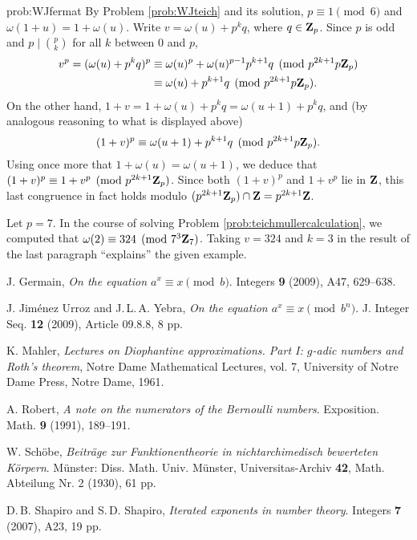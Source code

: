 \begin{sol}{prob:WJfermat}   By Problem \ref{prob:WJteich} and its solution, $p\equiv 1\pmod{6}$ and $\omega(1+u) = 1 + \omega(u)$. Write $v=\omega(u) + p^k q$, where $q \in \mathbf{Z}_p$. Since $p$ is odd and $p \mid \binom{p}{k}$ for all $k$ between $0$ and $p$,
\begin{align*}
  v^p = (\omega(u)+p^k q)^p &\equiv \omega(u)^{p} + \omega(u)^{p-1} p^{k+1} q \pmod{p^{2k+1}p\mathbf{Z}_p} \\
      &\equiv \omega(u) + p^{k+1} q \pmod{p^{2k+1} p\mathbf{Z}_p}. 
\end{align*} 
On the other hand, $1+v = 1 + \omega(u) + p^k q = \omega(u+1) + p^k q$, and (by analogous reasoning to what is displayed above)
\[ (1+v)^p \equiv \omega(u+1) + p^{k+1} q \pmod{p^{2k+1} p\mathbf{Z}_p}. \]
Using once more that $1+\omega(u) = \omega(u+1)$, we deduce that $(1+v)^p \equiv 1 + v^p \pmod{p^{2k+1}\mathbf{Z}_p}$. Since both $(1+v)^p$ and $1+v^p$ lie in $\mathbf{Z}$, this last congruence in fact holds modulo $(p^{2k+1} \mathbf{Z}_p) \cap \mathbf{Z} = p^{2k+1} \mathbf{Z}$. 

Let $p=7$. In the course of solving Problem \ref{prob:teichmullercalculation}, we computed that $\omega(2) \equiv 324 \pmod{7^3 \mathbf{Z}_7}$. Taking $v=324$ and $k=3$ in the result of the last paragraph ``explains'' the given example.
\end{sol}


\let\oldaddcontentsline\addcontentsline
\renewcommand{\addcontentsline}[3]{}
\begin{thebibliography}{11}

 J. Germain, \emph{
On the equation $a^x \equiv x\pmod{b}$}. 
Integers \textbf{9} (2009), A47, 629--638.


 J. Jiménez Urroz and {J.\,L.\,A.} Yebra, \emph{On the equation $a^x\equiv x\pmod{b^n}$}. J. Integer Seq. \textbf{12} (2009), Article 09.8.8, 8 pp.



 K. Mahler, \emph{Lectures on Diophantine approximations. Part I: $g$-adic numbers and {R}oth's theorem}, Notre Dame Mathematical Lectures, vol. 7, University of Notre Dame Press, Notre Dame, 1961.

 A. Robert, \emph{A note on the numerators of the Bernoulli numbers}. Exposition. Math. \textbf{9} (1991), 189--191. 

 W. Schöbe, \emph{Beiträge zur Funktionentheorie in nichtarchimedisch bewerteten Körpern}. Münster: Diss. Math. Univ. Münster, Universitas-Archiv \textbf{42}, Math. Abteilung Nr. 2 (1930), 61 pp.


 {D.\,B.} Shapiro and {S.\,D.} Shapiro, \emph{Iterated exponents in number theory}. Integers \textbf{7} (2007), A23, 19 pp.

\end{thebibliography}
\let\addcontentsline\oldaddcontentsline